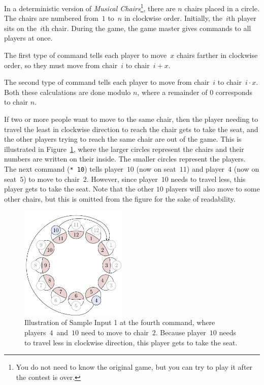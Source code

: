 
%
In a deterministic version of \emph{Musical Chairs}\footnote{You do not need to know the original game, but you can try to play it after the contest is over.}, there are $n$ chairs placed in a circle.
The chairs are numbered from~$1$ to~$n$ in clockwise order.
Initially, the~$i$th player sits on the~$i$th chair.
During the game, the game master gives commands to all players at once.

The first type of command tells each player to move~$x$ chairs farther in clockwise order,
so they must move from chair~$i$ to chair~$i+x$.

The second type of command tells each player to move from chair~$i$ to chair~$i\cdot{}x$.
Both these calculations are done modulo $n$, where a remainder of $0$ corresponds to chair $n$.

If two or more people want to move to the same chair,
then the player needing to travel the least in clockwise direction to reach the chair gets to take the seat,
and the other players trying to reach the same chair are out of the game.
This is illustrated in Figure~\ref{fig:chairs},
where the larger circles represent the chairs and their numbers are written on their inside.
The smaller circles represent the players.
The next command (\texttt{* 10}) tells player~$10$ (now on seat~$11$) and player~$4$ (now on seat~$5$) to move to chair~$2$.
However, since player~$10$ needs to travel less, this player gets to take the seat.
Note that the other $10$ players will also move to some other chairs,
but this is omitted from the figure for the sake of readability.

\begin{figure}[!h]
  \centering
  \includegraphics[width=0.45\textwidth]{sample}
  \caption{
    Illustration of Sample Input 1 at the fourth command, where players~$4$~and~$10$ need to move to chair~$2$.
    Because player~$10$ needs to travel less in clockwise direction, this player gets to take the seat.
  }
  \label{fig:chairs}
\end{figure}

